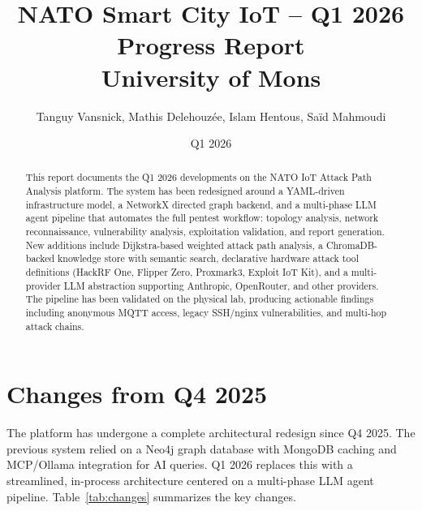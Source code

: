 \documentclass[11pt,a4paper]{article}
\title{\textbf{NATO Smart City IoT -- Q1 2026 Progress Report}\\
\large University of Mons}
\author{Tanguy Vansnick, Mathis Delehouzée, Islam Hentous, Saïd Mahmoudi}
\date{Q1 2026}
\begin{document}
\maketitle
\begin{abstract}
This report documents the Q1 2026 developments on the NATO IoT Attack Path Analysis platform. The system has been redesigned around a YAML-driven infrastructure model, a NetworkX directed graph backend, and a multi-phase LLM agent pipeline that automates the full pentest workflow: topology analysis, network reconnaissance, vulnerability analysis, exploitation validation, and report generation. New additions include Dijkstra-based weighted attack path analysis, a ChromaDB-backed knowledge store with semantic search, declarative hardware attack tool definitions (HackRF One, Flipper Zero, Proxmark3, Exploit IoT Kit), and a multi-provider LLM abstraction supporting Anthropic, OpenRouter, and other providers. The pipeline has been validated on the physical lab, producing actionable findings including anonymous MQTT access, legacy SSH/nginx vulnerabilities, and multi-hop attack chains.
\end{abstract}

\section{Changes from Q4 2025}

The platform has undergone a complete architectural redesign since Q4 2025. The previous system relied on a Neo4j graph database with MongoDB caching and MCP/Ollama integration for AI queries. Q1 2026 replaces this with a streamlined, in-process architecture centered on a multi-phase LLM agent pipeline. Table~\ref{tab:changes} summarizes the key changes.
\end{document}
